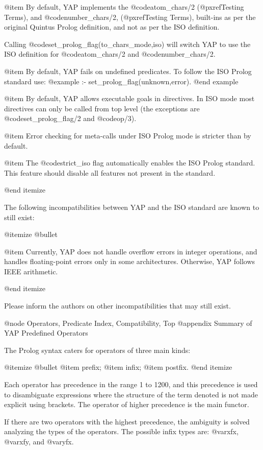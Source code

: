 {{{{{{{{{@item By default, YAP implements the @code{atom_chars/2}
(@pxref{Testing Terms}), and @code{number_chars/2}, (@pxref{Testing
Terms}), built-ins as per the original Quintus Prolog definition, and
not as per the ISO definition.

Calling @code{set_prolog_flag(to_chars_mode,iso)} will switch
YAP to use the ISO definition for
@code{atom_chars/2} and @code{number_chars/2}.

@item By default, YAP fails on undefined predicates. To follow the ISO
Prolog standard use:
@example
:- set_prolog_flag(unknown,error).
@end example

@item By default, YAP allows executable goals in directives. In ISO mode
most directives can only be called from top level (the exceptions are
@code{set_prolog_flag/2} and @code{op/3}).

@item Error checking for meta-calls under ISO Prolog mode is stricter
than by default.

@item The @code{strict_iso} flag automatically enables the ISO Prolog
standard. This feature should disable all features not present in the
standard.

@end itemize

The following incompatibilities between YAP and the ISO standard are
known to still exist:

@itemize @bullet

@item Currently, YAP does not handle overflow errors in integer
operations, and handles floating-point errors only in some
architectures. Otherwise, YAP follows IEEE arithmetic.

@end itemize

Please inform the authors on other incompatibilities that may still
exist.

@node Operators, Predicate Index, Compatibility, Top
@appendix Summary of YAP Predefined Operators


 The Prolog syntax caters for operators of three main kinds:

@itemize @bullet
@item
prefix;
@item
infix;
@item
postfix.
@end itemize

 Each operator has precedence in the range 1 to 1200, and this 
precedence is used to disambiguate expressions where the structure of the 
term denoted is not made explicit using brackets. The operator of higher 
precedence is the main functor.

 If there are two operators with the highest precedence, the ambiguity 
is solved analyzing the types of the operators. The possible infix types are: 
@var{xfx}, @var{xfy}, and @var{yfx}.

}}}}}}}}}
